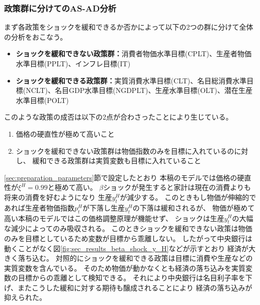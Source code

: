 \subsubsection{政策群に分けてのAS-AD分析}
\label{sec:sec_results_beta_shock_asad_analysis_groups}
まず各政策をショックを緩和できるか否かによって以下の2つの群に分けて全体の分析をおこなう。
\begin{itemize}
    \item \textbf{ショックを緩和できない政策群：}消費者物価水準目標(CPLT)、生産者物価水準目標(PPLT)、インフレ目標(IT)
    \item \textbf{ショックを緩和できる政策群：}実質消費水準目標(CLT)、名目総消費水準目標(NCLT)、名目GDP水準目標(NGDPLT)、生産水準目標(OLT)、潜在生産水準目標(POLT)
\end{itemize}
このような政策の成否は以下の2点が合わさったことにより生じている。
\begin{enumerate}
    \item\label{itm:sec_results_beta_shock_asad_analysis_groups_rigidity} 価格の硬直性が極めて高いこと
    \item\label{itm:sec_results_beta_shock_asad_analysis_groups_target} ショックを緩和できない政策群は物価指数のみを目標に入れているのに対し、
    緩和できる政策群は実質変数も目標に入れていること
\end{enumerate}
\ref{sec:preparation_parameters}節で設定したとおり
本稿のモデルでは価格の硬直性が\(\xi^H=0.99\)と極めて高い。
\(\beta\)ショックが発生すると家計は現在の消費よりも将来の消費を好むようになり
生産\(y_t^H\)が減少する。
このときもし物価が伸縮的であれば生産者物価指数\(p_t^H\)が下落し生産\(y_t^H\)の下落は緩和されるが、
物価が極めて高い本稿のモデルではこの価格調整原理が機能せず、
ショックは生産\(y_t^H\)の大幅な減少によってのみ吸収される。
このときショックを緩和できない政策は物価のみを目標としているため変数が目標から乖離しない。
したがって中央銀行は動くことがなく図\ref{fig:sec_results_beta_shock_y_H}などが示すとおり
経済が大きく落ち込む。
対照的にショックを緩和できる政策は目標に消費や生産などの実質変数を含んでいる。
そのため物価が動かなくとも経済の落ち込みを実質変数の目標からの乖離として検知できる。
それにより中央銀行は名目利子率を下げ、またこうした緩和に対する期待も醸成されることにより
経済の落ち込みが抑えられた。


